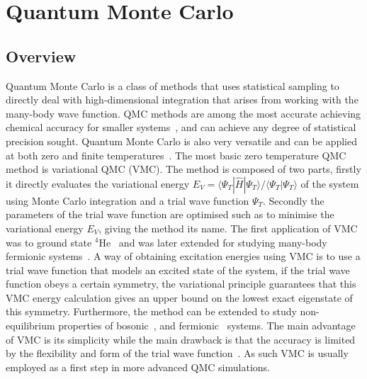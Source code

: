 \section{Quantum Monte Carlo}
\label{sec:qmc}

\subsection{Overview}
\label{subsec:qmc-hist}
Quantum Monte Carlo is a class of methods that uses statistical sampling to directly deal with high-dimensional integration that arises from working with the many-body wave function. QMC methods are among the most accurate achieving chemical accuracy for smaller systems~\cite{foulkes2001quantum}, and can achieve any degree of statistical precision sought. Quantum Monte Carlo is also very versatile and can be applied at both zero and finite temperatures~\cite{austin2012quantum}.	
The most basic zero temperature QMC method is variational QMC (VMC). The method is composed of two parts, firstly it directly evaluates the variational energy $E_V = \langle \Psi_{T} | \hat H | \Psi_{T} \rangle / \langle \Psi_{T} | \Psi_{T} \rangle$ of the system using Monte Carlo integration and a trial wave function $\Psi_{T}$. Secondly the parameters of the trial wave function are optimised such as to minimise the variational energy $E_V$, giving the method its name. The first application of VMC was to ground state ${}^4$He~\cite{mcmillan1965ground} and was later extended for studying many-body fermionic systems~\cite{ceperley1977monte}. A way of obtaining excitation energies using VMC is to use a trial wave function that models an excited state of the system, if the trial wave function obeys a certain symmetry, the variational principle guarantees that this VMC energy calculation gives an upper bound on the lowest exact eigenstate of this symmetry. Furthermore, the method can be extended to study non-equilibrium properties of bosonic~\cite{carleo2012localization, carleo2014light}, and fermionic~\cite{ido2015time} systems. The main advantage of VMC is its simplicity while the main drawback is that the accuracy is limited by the flexibility and form of the trial wave function~\cite{austin2012quantum}. As such VMC is usually employed as a first step in more advanced QMC simulations. 

